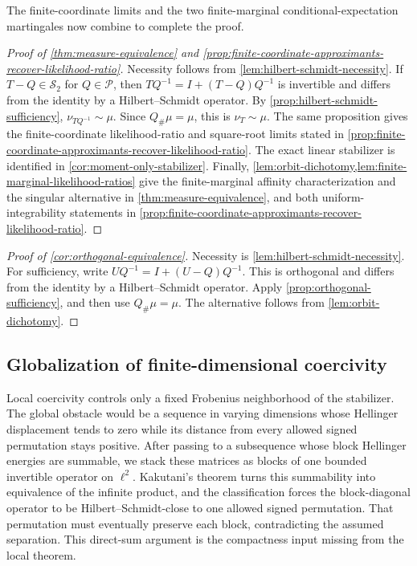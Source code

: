 The finite-coordinate limits and the two finite-marginal
conditional-expectation martingales now combine to complete the proof.

\begin{proof}[Proof of \cref{thm:measure-equivalence} and \cref{prop:finite-coordinate-approximants-recover-likelihood-ratio}]
Necessity follows from \cref{lem:hilbert-schmidt-necessity}.  If
$T-Q\in\mathcal S_2$ for $Q\in\mathcal P$, then
$TQ^{-1}=I+(T-Q)Q^{-1}$ is invertible and differs from the identity
by a Hilbert--Schmidt operator.  By \cref{prop:hilbert-schmidt-sufficiency},
$\nu_{TQ^{-1}}\sim\mu$.  Since $Q_\#\mu=\mu$, this is
$\nu_T\sim\mu$.  The same proposition gives the finite-coordinate
likelihood-ratio and square-root limits stated in
\cref{prop:finite-coordinate-approximants-recover-likelihood-ratio}.
The exact linear stabilizer is identified in
\cref{cor:moment-only-stabilizer}.
Finally, \cref{lem:orbit-dichotomy,lem:finite-marginal-likelihood-ratios}
give the finite-marginal affinity characterization and the singular
alternative in \cref{thm:measure-equivalence}, and both
uniform-integrability statements in
\cref{prop:finite-coordinate-approximants-recover-likelihood-ratio}.
\end{proof}
\begin{proof}[Proof of \cref{cor:orthogonal-equivalence}]
Necessity is \cref{lem:hilbert-schmidt-necessity}.  For sufficiency, write
$UQ^{-1}=I+(U-Q)Q^{-1}$.  This is orthogonal and differs from the
identity by a Hilbert--Schmidt operator.  Apply
\cref{prop:orthogonal-sufficiency}, and then use
$Q_\#\mu=\mu$.  The alternative follows from
\cref{lem:orbit-dichotomy}.
\end{proof}

\subsection{Globalization of finite-dimensional coercivity}
\label{sec:globalization-proof}

Local coercivity controls only a fixed Frobenius neighborhood of the
stabilizer.  The global obstacle would be a sequence in varying dimensions
whose Hellinger displacement tends to zero while its distance from every
allowed signed permutation stays positive.  After passing to a subsequence
whose block Hellinger energies are summable, we stack these matrices as blocks
of one bounded invertible operator on \(\ell^2\).  Kakutani's theorem turns this
summability into equivalence of the infinite product, and the classification
forces the block-diagonal operator to be Hilbert--Schmidt-close to one allowed
signed permutation.  That
permutation must eventually preserve each block, contradicting the assumed
separation.  This direct-sum argument is the compactness input missing from the
local theorem.

